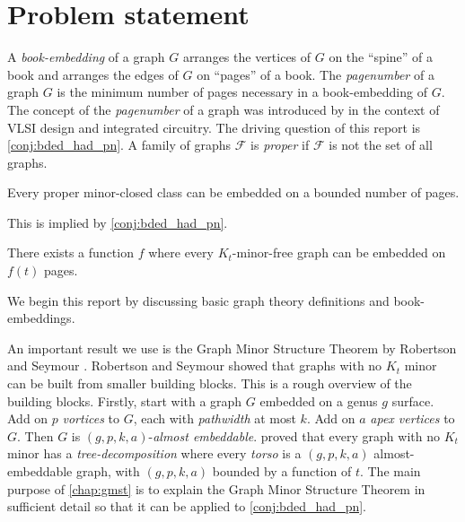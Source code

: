 \section{Problem statement}

A \textit{book-embedding} of a graph $G$ arranges the vertices of $G$ on the ``spine'' of a book and arranges the edges of $G$ on ``pages'' of a book. The \textit{pagenumber} of a graph \(G\) is the minimum number of pages necessary in a book-embedding of \(G\). The concept of the \textit{pagenumber} of a graph was introduced by \textcite{ollmannBookThicknessVarious1973} in the context of VLSI design and integrated circuitry. 
The driving question of this report is \cref{conj:bded_had_pn}. A family of graphs $\mathcal{F}$ is \textit{proper} if $\mathcal{F}$ is not the set of all graphs. 
\begin{conjecture}\label{lem:Minor-Closed_Pagenumber}
	Every proper minor-closed class can be embedded on a bounded number of pages.
\end{conjecture}

This is implied by \cref{conj:bded_had_pn}.

\begin{conjecture}\label{conj:bded_had_pn}
	There exists a function $f$ where every $K_t$-minor-free graph can be embedded on $f(t)$ pages.
\end{conjecture}

We begin this report by discussing basic graph theory definitions and book-embeddings.

An important result we use is the Graph Minor Structure Theorem by Robertson and Seymour \cite{robertsonGraphMinorsXVI2003}. Robertson and Seymour showed that graphs with no \(K_t\) minor can be built from smaller building blocks. This is a rough overview of the building blocks. Firstly, start with a graph \(G\) embedded on a genus \(g\) surface. Add on \(p\) \textit{vortices} to \(G\), each with \textit{pathwidth} at most \(k\). Add on \(a\) \textit{apex vertices} to \(G\). Then \(G\) is \((g, p, k, a)\)-\textit{almost embeddable}. \textcite{robertsonGraphMinorsXVI2003} proved that every graph with no \(K_t\) minor has a \textit{tree-decomposition} where every \textit{torso} is a \((g, p, k, a)\) almost-embeddable graph, with \((g, p, k, a)\) bounded by a function of \(t\). The main purpose of \cref{chap:gmst} is to explain the Graph Minor Structure Theorem in sufficient detail so that it can be applied to \cref{conj:bded_had_pn}.

